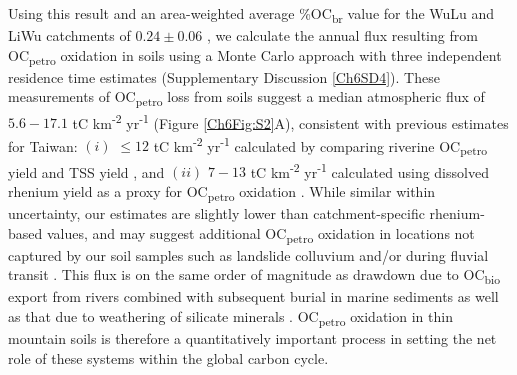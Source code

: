 Using this result and an area-weighted average \%OC\textsubscript{br} value for the WuLu and LiWu catchments of $0.24 \pm 0.06$ \citep{Hilton:2010cg}, we calculate the annual  flux resulting from OC\textsubscript{petro} oxidation in soils using a Monte Carlo approach with three independent residence time estimates (Supplementary Discussion \ref{Ch6SD4}). These measurements of OC\textsubscript{petro} loss from soils suggest a median atmospheric  flux of $5.6 - 17.1$ tC km\textsuperscript{-2} yr\textsuperscript{-1} (Figure \ref{Ch6Fig:S2}A), consistent with previous estimates for Taiwan: $(i)$ $\leq 12$ tC km\textsuperscript{-2} yr\textsuperscript{-1} calculated by comparing riverine OC\textsubscript{petro} yield and TSS yield \citep[Figure \ref{Ch6Fig:S2}B;][]{Hilton:2011jw}, and $(ii)$ $7 - 13$ tC km\textsuperscript{-2} yr\textsuperscript{-1} calculated using dissolved rhenium yield as a proxy for OC\textsubscript{petro} oxidation \citep[Figure \ref{Ch6Fig:S2}B;][]{Hilton:2014dh}. While similar within uncertainty, our estimates are slightly lower than catchment-specific rhenium-based values, and may suggest additional OC\textsubscript{petro} oxidation in locations not captured by our soil samples such as landslide colluvium \citep{Emberson:2016fp} and/or during fluvial transit \citep{Galy:2008ff}. This flux is on the same order of magnitude as  drawdown due to OC\textsubscript{bio} export from rivers combined with subsequent burial in marine sediments \citep[Taiwan average: $21 \pm 10$ tC km\textsuperscript{-2} yr\textsuperscript{-1}; Figure \ref{Ch6Fig:S2}C;][]{Hilton:2012dt} as well as that due to weathering of silicate minerals \citep[LiWu River: $7.04$ tC km\textsuperscript{-2} yr\textsuperscript{-1}; Figure \ref{Ch6Fig:S2}D;][]{Calmels:2011gv}. OC\textsubscript{petro} oxidation in thin mountain soils is therefore a quantitatively important process in setting the net role of these systems within the global carbon cycle.

